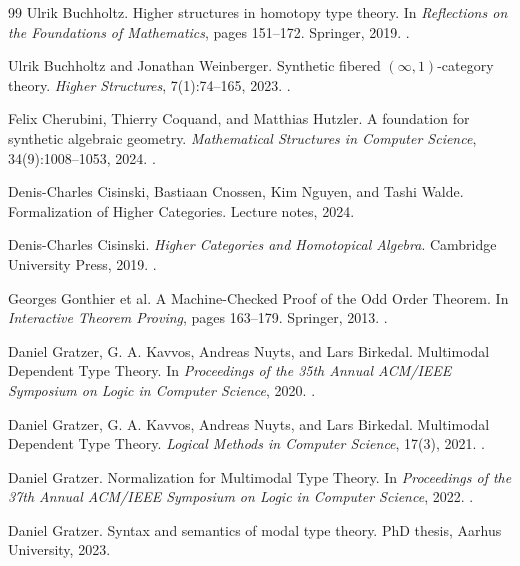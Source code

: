 \documentclass[12pt]{article}
\begin{document}
\begin{thebibliography}{99}
Ulrik Buchholtz.
\newblock Higher structures in homotopy type theory.
\newblock In \emph{Reflections on the Foundations of Mathematics}, pages 151--172. Springer, 2019.
\newblock {}.

Ulrik Buchholtz and Jonathan Weinberger.
\newblock Synthetic fibered $(\infty,1)$-category theory.
\newblock \emph{Higher Structures}, 7(1):74--165, 2023.
\newblock {}.

Felix Cherubini, Thierry Coquand, and Matthias Hutzler.
\newblock A foundation for synthetic algebraic geometry.
\newblock \emph{Mathematical Structures in Computer Science}, 34(9):1008--1053, 2024.
\newblock {}.

Denis-Charles Cisinski, Bastiaan Cnossen, Kim Nguyen, and Tashi Walde.
\newblock Formalization of Higher Categories.
\newblock Lecture notes, 2024.

Denis-Charles Cisinski.
\newblock \emph{Higher Categories and Homotopical Algebra}.
\newblock Cambridge University Press, 2019.
\newblock {}.

Georges Gonthier et al.
\newblock A Machine-Checked Proof of the Odd Order Theorem.
\newblock In \emph{Interactive Theorem Proving}, pages 163--179. Springer, 2013.
\newblock {}.

Daniel Gratzer, G. A. Kavvos, Andreas Nuyts, and Lars Birkedal.
\newblock Multimodal Dependent Type Theory.
\newblock In \emph{Proceedings of the 35th Annual ACM/IEEE Symposium on Logic in Computer Science}, 2020.
\newblock {}.

Daniel Gratzer, G. A. Kavvos, Andreas Nuyts, and Lars Birkedal.
\newblock Multimodal Dependent Type Theory.
\newblock \emph{Logical Methods in Computer Science}, 17(3), 2021.
\newblock {}.

Daniel Gratzer.
\newblock Normalization for Multimodal Type Theory.
\newblock In \emph{Proceedings of the 37th Annual ACM/IEEE Symposium on Logic in Computer Science}, 2022.
\newblock {}.

Daniel Gratzer.
\newblock Syntax and semantics of modal type theory.
\newblock PhD thesis, Aarhus University, 2023.


\end{thebibliography}
\end{document}

